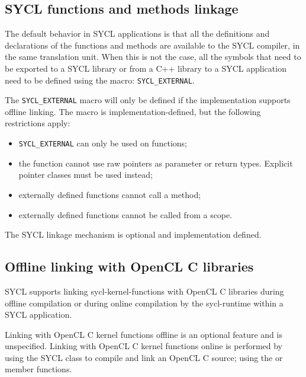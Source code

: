\subsection{SYCL functions and methods linkage}
\label{subsec:syclexternal}
The default behavior in SYCL applications is that all the definitions and
declarations of the functions and methods are available to the SYCL compiler,
in the same translation unit. When this is not the case, all the symbols that
need to be exported to a SYCL library or from a C++ library to a SYCL
application need to be defined using the macro: \texttt{SYCL_EXTERNAL}.

The \texttt{SYCL_EXTERNAL} macro will only be defined if the implementation
supports offline linking. The macro is implementation-defined, but the following
restrictions apply:
\begin{itemize}
\item \texttt{SYCL_EXTERNAL} can only be used on functions;
\item the function cannot use raw pointers as parameter or return types.
  Explicit pointer classes must be used instead;
\item externally defined functions cannot call a
   method;
\item externally defined functions cannot be called from a
   scope.
\end{itemize}

The SYCL linkage mechanism is optional and implementation defined.

\subsection{Offline linking with OpenCL C libraries}

SYCL supports linking \glspl{sycl-kernel-function} with OpenCL C libraries
during offline compilation or during online compilation by the
\gls{sycl-runtime} within a SYCL application.

Linking with OpenCL C kernel functions offline is an optional feature and is
unspecified. Linking with OpenCL C kernel functions online is performed by
using the SYCL  class to compile and link an OpenCL C source;
using the  or 
member functions.

